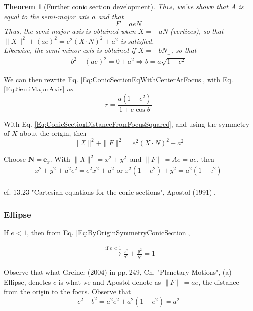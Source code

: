 \documentclass[10pt]{amsart}
\newtheorem{theorem}{Theorem}
\begin{document}
\begin{multicols*}{2}
\begin{theorem}[Further conic section development]
Thus, we've shown that $A$ is equal to the \emph{semi-major axis} $a$ and that 
\begin{equation}
\boxed{ F = aeN }
\end{equation}
Thus, the semi-major axis is obtained when $X = \pm aN$ (vertices), so that $\| X \|^2 + (ae)^2 = e^2 ( X\cdot N)^2 + a^2$ is satisfied. \\
Likewise, the semi-minor axis is obtained if $X = \pm bN_{\perp}$, so that
\begin{equation}\label{Eq:ConicSectionSemiMinorAxis}
\begin{gathered}
	b^2 + (ae)^2 = 0 + a^2 \Longrightarrow \boxed{ b = a \sqrt{ 1 - e^2 } }
\end{gathered} 
\end{equation}

\end{theorem}

We can then rewrite Eq. \ref{Eq:ConicSectionEqWithCenterAtFocus}, with Eq. \ref{Eq:SemiMajorAxis} as
\[
\boxed{ r = \frac{ a(1-e^2) }{ 1 + e\cos{\theta} } }
\]

With Eq. \ref{Eq:ConicSectionDistanceFromFocusSquared}, and using the symmetry of $X$ about the origin, then
\[
\| X \|^2 + \| F \|^2 = e^2 (X\cdot N)^2 + a^2
\]

Choose $\mathbf{N} = \mathbf{e}_x$. With $\|X\|^2 = x^2 + y^2$, and $\|F\| = Ae = ae$, then
\begin{equation}\label{Eq:ByOriginSymmetryConicSection}
\begin{gathered}
x^2 + y^2 +a^2 e^2 = e^2 x^2 + a^2 \text{ or } x^2 ( 1 -e^2) + y^2 = a^2 ( 1-e^2) \\
\end{gathered}
\end{equation}

cf. 13.23 "Cartesian equations for the conic sections", Apostol (1991) \cite{Apos1991}.

\subsubsection{Ellipse}

If $e <1$, then from Eq. \ref{Eq:ByOriginSymmetryConicSection},

\[
\begin{gathered}
\xrightarrow{ \text{ if } e < 1 } \frac{x^2 }{ a^2 } + \frac{y^2}{b^2} = 1
\end{gathered}
\]

Observe that what  Greiner (2004) \cite{Grei2004} in pp. 249, Ch. "Planetary Motions", (a) Ellipse, denotes $c$ is what we and Apostol denote as $\|F \| =ae$, the distance from the origin to the focus. Observe that
\[
c^2 + b^2 = a^2 e^2 + a^2 (1-e^2) = a^2
\]


\end{multicols*}
\end{document}
